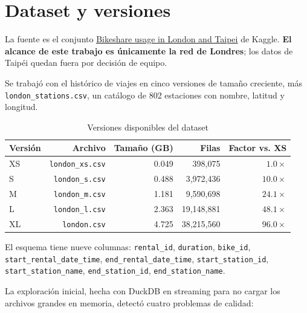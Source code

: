 \section{Dataset y versiones}
\label{sec:dataset}

La fuente es el conjunto \href{https://www.kaggle.com/datasets/ajohrn/bikeshare-usage-in-london-and-taipei-network}{Bikeshare usage in London and Taipei} de Kaggle. \textbf{El alcance de este trabajo es únicamente la red de Londres}; los datos de Taipéi quedan fuera por decisión de equipo.

Se trabajó con el histórico de viajes en cinco versiones de tamaño creciente, más \texttt{london\_stations.csv}, un catálogo de 802 estaciones con nombre, latitud y longitud.

\begin{table}[htbp]
\centering
\caption{Versiones disponibles del dataset}
\label{tab:versiones}
\begin{tabular}{lrrrr}
\toprule
Versión & Archivo & Tamaño (GB) & Filas & Factor vs. XS \\
\midrule
XS & \texttt{london\_xs.csv} & 0.049 & 398,075 & $1.0\times$ \\
S  & \texttt{london\_s.csv}  & 0.488 & 3,972,436 & $10.0\times$ \\
M  & \texttt{london\_m.csv}  & 1.181 & 9,590,698 & $24.1\times$ \\
L  & \texttt{london\_l.csv}  & 2.363 & 19,148,881 & $48.1\times$ \\
XL & \texttt{london.csv}     & 4.725 & 38,215,560 & $96.0\times$ \\
\bottomrule
\end{tabular}
\end{table}

El esquema tiene nueve columnas: \texttt{rental\_id}, \texttt{duration}, \texttt{bike\_id}, \texttt{start\_rental\_date\_time}, \texttt{end\_rental\_date\_time}, \texttt{start\_station\_id}, \texttt{start\_station\_name}, \texttt{end\_station\_id}, \texttt{end\_station\_name}.

La exploración inicial, hecha con DuckDB en streaming para no cargar los archivos grandes en memoria, detectó cuatro problemas de calidad:

